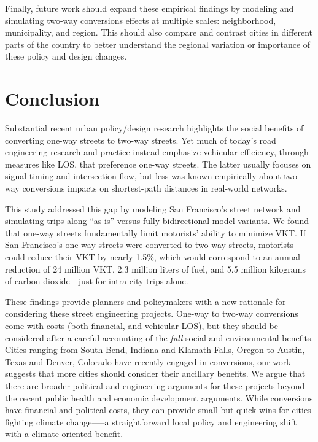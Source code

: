 \documentclass{article}
\begin{document}
Finally, future work should expand these empirical findings by modeling and simulating two-way conversions effects at multiple scales: neighborhood, municipality, and region. This should also compare and contrast cities in different parts of the country to better understand the regional variation or importance of these policy and design changes.

\section{Conclusion}

Substantial recent urban policy/design research highlights the social benefits of converting one-way streets to two-way streets. Yet much of today's road engineering research and practice instead emphasize vehicular efficiency, through measures like LOS, that preference one-way streets. The latter usually focuses on signal timing and intersection flow, but less was known empirically about two-way conversions impacts on shortest-path distances in real-world networks.

This study addressed this gap by modeling San Francisco's street network and simulating trips along \enquote{as-is} versus fully-bidirectional model variants. We found that one-way streets fundamentally limit motorists' ability to minimize VKT. If San Francisco's one-way streets were converted to two-way streets, motorists could reduce their VKT by nearly 1.5\%, which would correspond to an annual reduction of 24 million VKT, 2.3 million liters of fuel, and 5.5 million kilograms of carbon dioxide---just for intra-city trips alone.

These findings provide planners and policymakers with a new rationale for considering these street engineering projects. One-way to two-way conversions come with costs (both financial, and vehicular LOS), but they should be considered after a careful accounting of the \textit{full} social and environmental benefits. Cities ranging from South Bend, Indiana and Klamath Falls, Oregon to Austin, Texas and Denver, Colorado have recently engaged in conversions, our work suggests that more cities should consider their ancillary benefits. We argue that there are broader political and engineering arguments for these projects beyond the recent public health and economic development arguments. While conversions have financial and political costs, they can provide small but quick wins for cities fighting climate change--—a straightforward local policy and engineering shift with a climate-oriented benefit. 





\end{document}
